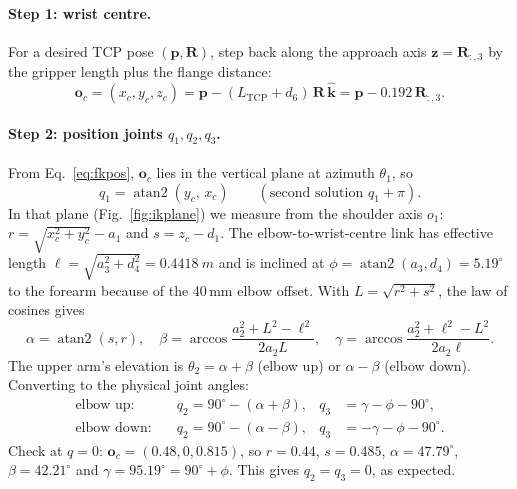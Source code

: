 \documentclass[11pt,a4paper]{article}
\newcommand{\atantwo}{\operatorname{atan2}}
\begin{document}
\paragraph{Step 1: wrist centre.}
For a desired TCP pose \((\mathbf p, \mathbf R)\), step back along the approach axis
\(\mathbf z = \mathbf R_{:,3}\) by the gripper length plus the flange distance:
\begin{equation}
\mathbf o_c = (x_c, y_c, z_c) = \mathbf p - (L_\text{TCP} + d_6)\,\mathbf R\,\hat{\mathbf k}
= \mathbf p - 0.192\,\mathbf R_{:,3}.
\end{equation}

\paragraph{Step 2: position joints \(q_1, q_2, q_3\).}
From Eq.~\eqref{eq:fkpos}, \(\mathbf o_c\) lies in the vertical plane at azimuth \(\theta_1\), so
\begin{equation}
q_1 = \atantwo(y_c,\, x_c) \qquad(\text{second solution } q_1+\pi).
\end{equation}
In that plane (Fig.~\ref{fig:ikplane}) we measure from the shoulder axis \(o_1\):
\(r = \sqrt{x_c^2+y_c^2} - a_1\) and \(s = z_c - d_1\). The elbow-to-wrist-centre link
has effective length \(\ell = \sqrt{a_3^2 + d_4^2} = \SI{0.4418}{m}\) and is inclined
at \(\phi=\atantwo(a_3,d_4) = 5.19^\circ\) to the forearm because of the 40\,mm elbow offset.
With \(L=\sqrt{r^2+s^2}\), the law of cosines gives
\begin{equation}
\alpha = \atantwo(s, r),\quad
\beta = \arccos\frac{a_2^2 + L^2 - \ell^2}{2a_2L},\quad
\gamma = \arccos\frac{a_2^2 + \ell^2 - L^2}{2a_2\ell}.
\end{equation}
The upper arm's elevation is \(\theta_2 = \alpha+\beta\) (elbow up) or \(\alpha-\beta\)
(elbow down). Converting to the physical joint angles:
\begin{equation}
\begin{aligned}
\text{elbow up:}&\quad q_2 = 90^\circ - (\alpha+\beta), & q_3 &= \gamma - \phi - 90^\circ,\\
\text{elbow down:}&\quad q_2 = 90^\circ - (\alpha-\beta), & q_3 &= -\gamma - \phi - 90^\circ.
\end{aligned}
\end{equation}
Check at \(q=0\): \(\mathbf o_c=(0.48,0,0.815)\), so \(r=0.44\), \(s=0.485\),
\(\alpha=47.79^\circ\), \(\beta=42.21^\circ\) and \(\gamma=95.19^\circ = 90^\circ+\phi\).
This gives \(q_2=q_3=0\), as expected.
\end{document}
